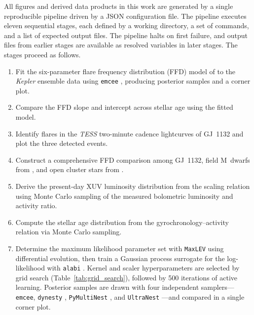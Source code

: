 All figures and derived data products in this work are generated by a
single reproducible pipeline driven by a JSON configuration file. The
pipeline executes eleven sequential stages, each defined by a working
directory, a set of commands, and a list of expected output files. The
pipeline halts on first failure, and output files from earlier stages
are available as resolved variables in later stages. The stages
proceed as follows.

\begin{enumerate}

\item Fit the six-parameter flare frequency distribution (FFD) model
of \citet{Davenport19} to the \emph{Kepler} ensemble data using
\texttt{emcee} \citep{ForemanMackey13}, producing posterior samples
and a corner plot.

\item Compare the FFD slope and intercept across stellar age using
the fitted model.

\item Identify flares in the \emph{TESS} two-minute cadence
lightcurves of GJ~1132 and plot the three detected events.

\item Construct a comprehensive FFD comparison among GJ~1132, field
M~dwarfs from \citet{Hawley14}, and open cluster stars from
\citet{Ilin19}.

\item Derive the present-day XUV luminosity distribution from the
\citet{Ribas05} scaling relation using Monte Carlo sampling of the
measured bolometric luminosity and activity ratio.

\item Compute the stellar age distribution from the
\citet{Engle24} gyrochronology--activity relation via Monte Carlo
sampling.

\item Determine the maximum likelihood parameter set with
\texttt{MaxLEV} using differential evolution, then train a Gaussian
process surrogate for the log-likelihood with \texttt{alabi}
\citep{Birky25}. Kernel and scaler hyperparameters are selected by
grid search (Table~\ref{tab:grid_search}), followed by 500 iterations
of active learning. Posterior samples are drawn with four independent
samplers---\texttt{emcee}, \texttt{dynesty} \citep{Speagle20},
\texttt{PyMultiNest} \citep{Buchner14}, and \texttt{UltraNest}
\citep{Buchner21}---and compared in a single corner plot.


\end{enumerate}
